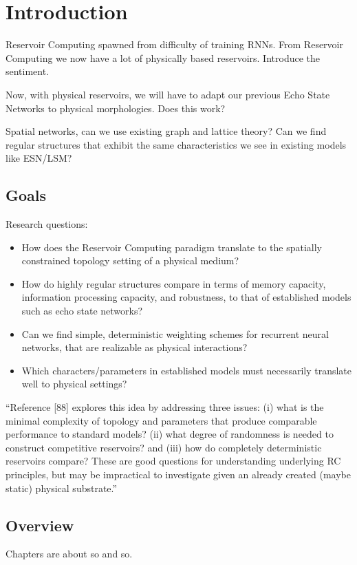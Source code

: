 \chapter{Introduction}

Reservoir Computing spawned from difficulty of training RNNs. From Reservoir
Computing we now have a lot of physically based reservoirs. Introduce the
sentiment.

Now, with physical reservoirs, we will have to adapt our previous Echo State
Networks to physical morphologies. Does this work?

Spatial networks, can we use existing graph and lattice theory? Can we find
regular structures that exhibit the same characteristics we see in existing
models like ESN/LSM?

\section{Goals}

Research questions:

\begin{itemize}
\item How does the Reservoir Computing paradigm translate to the spatially
constrained topology setting of a physical medium?
\item How do highly regular structures compare in terms of memory capacity,
information processing capacity, and robustness, to that of established models
such as echo state networks?
\item Can we find simple, deterministic weighting schemes for recurrent neural
networks, that are realizable as physical interactions?
\item Which characters/parameters in established models must necessarily
translate well to physical settings?
\end{itemize}

``Reference [88] explores this idea by addressing three issues: (i) what is the
minimal complexity of topology and parameters that produce comparable
performance to standard models?  (ii) what degree of randomness is needed to
construct competitive reservoirs? and (iii) how do completely deterministic
reservoirs compare? These are good questions for understanding underlying RC
principles, but may be impractical to investigate given an already created
(maybe static) physical substrate.''

\section{Overview}

Chapters are about so and so.


